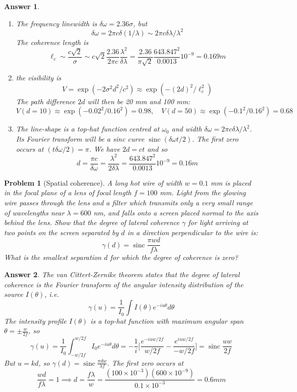 \documentclass[a4paper]{article}
\DeclareMathOperator{\sinc}{sinc}
\newtheorem{ans}{Answer}
\theoremstyle{new}
\newtheorem{qns}{Problem}
\begin{document}
\begin{ans}\leavevmode
\begin{enumerate}[label=(\alph*)]
\item The frequency linewidth is $\delta\omega=2.36\sigma$, but
$$\delta\omega=2\pi c\delta(1/\lambda)\sim2\pi c\delta\lambda/\lambda^2$$
The coherence length is
$$\ell_c\sim\frac{c\sqrt{2}}{\sigma}\sim c\sqrt{2}\frac{2.36}{2\pi c}\frac{\lambda^2}{\delta\lambda}=\frac{2.36}{\pi\sqrt{2}}\frac{643.847^2}{0.0013}10^{-9}=0.169m$$
\item the visibility is
$$V=\exp(-2\sigma^2d^2/c^2)\approx\exp(-(2d)^2/\ell_c^2)$$
The path difference $2d$ will then be 20 mm and 100 mm:
$$V(d=10)\approx\exp(-0.02^2/0.16^2)=0.98,\quad V(d=50)\approx\exp(-0.1^2/0.16^2)=0.68$$
\item The line-shape is a top-hat function centred at $\omega_0$ and width $\delta\omega=2\pi c\delta\lambda/\lambda^2$. Its Fourier transform will be a sinc curve $\sinc(\delta\omega t/2)$. The first zero occurs at $(t\delta\omega/2)=\pi$. We have $2d=ct$ and so
$$d=\frac{\pi c}{\delta\omega}=\frac{\lambda^2}{2\delta\lambda}=\frac{643.847^2}{0.0013}10^{-9}=0.16 m$$
\end{enumerate}
\end{ans}
\begin{qns}[Spatial coherence]
A long hot wire of width $w = 0.1$ mm is placed in the focal plane of a lens of focal length $f = 100$ mm. Light from the glowing wire passes through the lens and a filter which transmits only a very small range of wavelengths near $\lambda=600$ nm, and falls onto a screen placed normal to the axis behind the lens. Show that the degree of lateral coherence $\gamma$ for light arriving at two points on the screen separated by $d$ in a direction perpendicular to the wire is:
$$\gamma(d)=\sinc\frac{\pi wd}{f\lambda}$$
What is the smallest separation $d$ for which the degree of coherence is zero?
\end{qns}
\begin{ans}
The van Cittert-Zernike theorem states that the degree of lateral coherence is the Fourier transform of the angular intensity distribution of the source $I(\theta)$, i.e.
$$\gamma(u)=\frac{1}{I_0}\int I(\theta)e^{-iu\theta}d\theta$$
The intensity profile $I(\theta)$ is a top-hat function with maximum angular span $\theta=\pm\frac{w}{2f}$, so
$$\gamma(u)=\frac{1}{I_0}\int_{-w/2f}^{w/2f}I_0e^{-iu\theta}d\theta=-\frac{1}{i}\bigg[\frac{e^{-iuw/2f}}{w/2f}-\frac{e^{iuw/2f}}{-w/2f}\bigg]=\sinc\frac{uw}{2f}$$
But $u=kd$, so $\gamma(d)=\sinc\frac{\pi dw}{\lambda f}$. The first zero occurs at 
$$\frac{wd}{f\lambda}=1\implies d=\frac{f\lambda}{w}=\frac{(100\times10^{-3})(600\times10^{-9})}{0.1\times10^{-3}}=0.6mm$$
\end{ans}
\newpage
\end{document}
